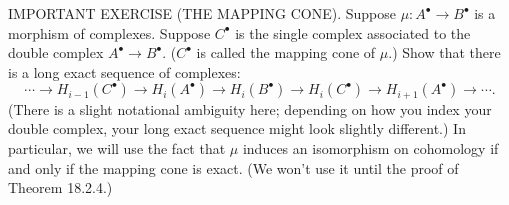 IMPORTANT EXERCISE (THE MAPPING CONE). Suppose $\mu:A^\bullet\to B^\bullet$ is a morphism of complexes. Suppose $C^\bullet$ is the single complex associated to the double complex $A^\bullet\to B^\bullet$. ($C^\bullet$ is called the mapping cone of $\mu$.) Show that there is a long exact sequence of complexes:
$$
\cdots\to H_{i-1}(C^\bullet)\to H_i(A^\bullet)\to H_i(B^\bullet)\to H_i(C^\bullet)\to H_{i+1}(A^\bullet)\to\cdots.
$$
(There is a slight notational ambiguity here; depending on how you index your double complex, your long exact sequence might look slightly different.) In particular, we will use the fact that $\mu$ induces an isomorphism on cohomology if and only if the mapping cone is exact. (We won’t use it until the proof of Theorem 18.2.4.)
